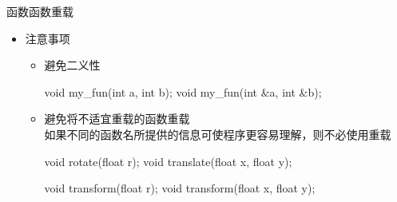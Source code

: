 \begin{frame}[fragile]{函数}{函数重载}
  \stretchon
  \begin{itemize}
  \item 注意事项
    \begin{itemize}
    \item 避免二义性\\
        \begin{minipage}{0.5\linewidth}
          \begin{cppcode}
void my_fun(int a, int b);
void my_fun(int &a, int &b);
          \end{cppcode}
        \end{minipage}
    \item 避免将不适宜重载的函数重载\\
      {\tiny 如果不同的函数名所提供的信息可使程序更容易理解，则不必使用重载}
        \begin{minipage}{0.5\linewidth}
          \begin{cppcode}
void rotate(float r);
void translate(float x, float y);
          \end{cppcode}
          \vspace{-2ex}
          \begin{cppcode}
void transform(float r);
void transform(float x, float y);
          \end{cppcode}
        \end{minipage}
    \end{itemize}
  \end{itemize}
  \stretchoff
\end{frame}
